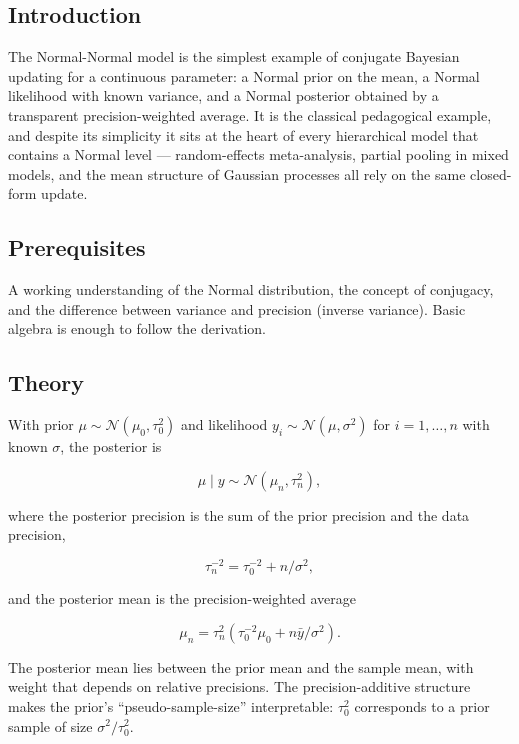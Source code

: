 \documentclass[
]{article}
\author{}
\date{\vspace{-2.5em}}
\begin{document}
\subsection{Introduction}\label{introduction}

The Normal-Normal model is the simplest example of conjugate Bayesian
updating for a continuous parameter: a Normal prior on the mean, a
Normal likelihood with known variance, and a Normal posterior obtained
by a transparent precision-weighted average. It is the classical
pedagogical example, and despite its simplicity it sits at the heart of
every hierarchical model that contains a Normal level --- random-effects
meta-analysis, partial pooling in mixed models, and the mean structure
of Gaussian processes all rely on the same closed-form update.

\subsection{Prerequisites}\label{prerequisites}

A working understanding of the Normal distribution, the concept of
conjugacy, and the difference between variance and precision (inverse
variance). Basic algebra is enough to follow the derivation.

\subsection{Theory}\label{theory}

With prior \(\mu \sim \mathcal N(\mu_0, \tau_0^2)\) and likelihood
\(y_i \sim \mathcal N(\mu, \sigma^2)\) for \(i = 1, \dots, n\) with
known \(\sigma\), the posterior is

\[\mu \mid y \sim \mathcal N(\mu_n, \tau_n^2),\]

where the posterior precision is the sum of the prior precision and the
data precision,

\[\tau_n^{-2} = \tau_0^{-2} + n / \sigma^2,\]

and the posterior mean is the precision-weighted average

\[\mu_n = \tau_n^2 \left(\tau_0^{-2} \mu_0 + n \bar y / \sigma^2\right).\]

The posterior mean lies between the prior mean and the sample mean, with
weight that depends on relative precisions. The precision-additive
structure makes the prior's ``pseudo-sample-size'' interpretable:
\(\tau_0^2\) corresponds to a prior sample of size
\(\sigma^2 / \tau_0^2\).
\end{document}
